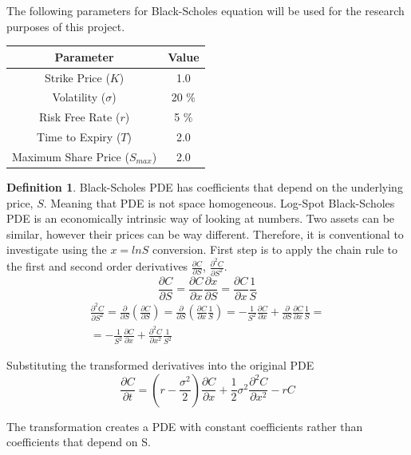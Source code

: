 \documentclass[12pt, oneside]{book}
\theoremstyle{plain}
\theoremstyle{definition}
\newtheorem{definition}[theorem]{Definition}
\begin{document}
The following parameters for Black-Scholes equation will be used for the research purposes of this project.
\begin{table}[h!]
\centering
 \begin{tabular}{||c c||} 
 \hline
 Parameter & Value\\ [0.5ex]
 \hline\hline
 Strike Price ($K$) & 1.0\\ 
 Volatility ($\sigma$) & 20 \% \\
 Risk Free Rate ($r$) & 5 \% \\
 Time to Expiry ($T$) & 2.0\\
 Maximum Share Price ($S_{max}$) & 2.0\\ [1ex] 
 \hline
 \end{tabular}
\end{table}

\begin{definition} 
Black-Scholes PDE has coefficients that depend on the underlying price, $S$. Meaning that PDE is not space homogeneous. Log-Spot Black-Scholes PDE is an economically intrinsic way of looking at numbers. Two assets can be similar, however their prices can be way different. Therefore, it is conventional to investigate using the $x = ln S$ conversion. First step is to apply the chain rule to the first and second order derivatives $\frac{\partial C}{\partial S} $, $\frac{\partial^2 C}{\partial S^2}$.
\begin{equation}
\frac{\partial C}{\partial S} = \frac{\partial C}{\partial x} \frac{\partial x}{\partial S} = \frac{\partial C}{\partial x} \frac{1}{S}
\end{equation}
\begin{eqnarray}
\frac{\partial^2 C}{\partial S^2} = \frac{\partial }{\partial S} (\frac{\partial C}{\partial S}) = \frac{\partial }{\partial S} (\frac{\partial C}{\partial x} \frac{1}{S}) = -\frac{1}{S^2} \frac{\partial C}{\partial x} + \frac{\partial }{\partial S} \frac{\partial C}{\partial x} \frac{1}{S} = \\
 = -\frac{1}{S^2} \frac{\partial C}{\partial x} + \frac{\partial^2 C}{\partial x^2} \frac{1}{S^2} 
\end{eqnarray}

Substituting the transformed derivatives into the original PDE 
\begin{equation}
\frac{\partial C}{\partial t} = (r - \frac{\sigma^2}{2})\frac{\partial C}{\partial x}+\frac{1}{2} \sigma^2 \frac{\partial^2 C}{\partial x^2} - rC
\end{equation}

The transformation creates a PDE with constant coefficients rather than coefficients that depend on S. 

\end{definition}
\end{document}
